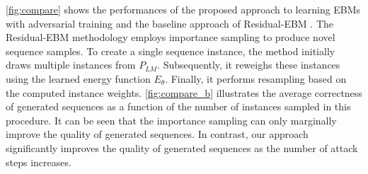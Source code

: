 \documentclass{article}
\begin{document}
\cref{fig:compare} shows the performances of the proposed approach to learning EBMs with adversarial training and the baseline approach of Residual-EBM \citep{deng2019residual}. 
The Residual-EBM methodology employs importance sampling to produce novel sequence samples. To create a single sequence instance, the method initially draws multiple instances from \( P_{LM} \). Subsequently, it reweighs these instances using the learned energy function \( E_\theta \). Finally, it performs resampling based on the computed instance weights. \cref{fig:compare_b} illustrates the average correctness of generated sequences as a function of the number of instances sampled in this procedure. It can be seen that the importance sampling can only marginally improve the quality of generated sequences. In contrast, our approach significantly improves the quality of generated sequences as the number of attack steps increases.
\end{document}
